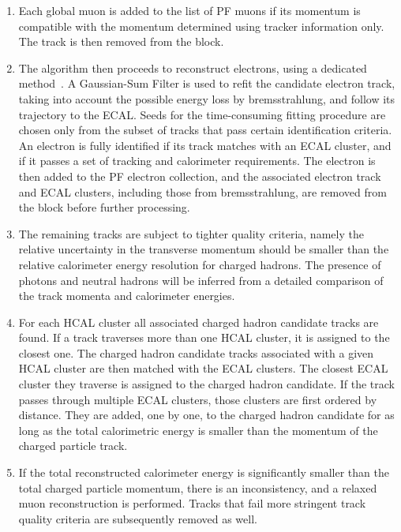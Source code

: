 \begin{enumerate}
  \item Each global muon is added to the list of PF muons if its momentum is compatible with the
momentum determined using tracker information only. The track is then removed from the block. 

  \item The algorithm then proceeds to reconstruct electrons, using a dedicated
method~\cite{Khachatryan:2015hwa}. A Gaussian-Sum Filter is used to refit the candidate electron
track, taking into account the possible energy loss by bremsstrahlung, and follow its trajectory to
the ECAL. Seeds for the time-consuming fitting procedure are chosen only from the subset of tracks
that pass certain identification criteria.
An electron is fully identified if its track matches with an ECAL cluster, and if it passes a set of
tracking and calorimeter requirements. The electron is then added to the PF electron
collection, and the associated electron track and ECAL clusters, including those from
bremsstrahlung, are removed from the block before further processing. 

  \item The remaining tracks are subject to tighter quality criteria, namely the relative
uncertainty in the transverse momentum should be smaller than the relative calorimeter energy
resolution for charged hadrons. The presence of photons and neutral hadrons will be inferred from a
detailed comparison of the track momenta and calorimeter energies. 

  \item For each HCAL cluster all associated charged hadron candidate tracks are found. If a track
traverses more than one HCAL cluster, it is assigned to the closest one. 
  The charged hadron candidate tracks associated with a given HCAL cluster are then matched with
the ECAL clusters. The closest ECAL cluster they traverse is assigned to the charged hadron
candidate. If the track passes through multiple ECAL clusters, those clusters are first ordered by
distance. They are added, one by one, to the charged hadron candidate for as long as the total
calorimetric energy is smaller than the momentum of the charged particle track. 

  \item If the total reconstructed calorimeter energy is significantly smaller than the total
charged particle momentum, there is an inconsistency, and a relaxed muon reconstruction is
performed.
Tracks that fail more stringent track quality criteria are subsequently removed as well. 


\end{enumerate}
